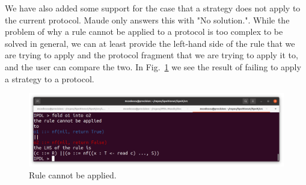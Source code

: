 \documentclass{article}
\begin{document}
We have also added some support for the case that a strategy does not
apply to the current protocol. Maude only answers this with "No solution.".
While the problem of why a rule cannot be applied to a protocol is too
complex to be solved in general, we can at least provide the left-hand side of the rule that we are trying to apply and the protocol fragment that we
are trying to apply it to, and the user can compare the two. In Fig.~\ref{fig:rule} we see the result of failing to apply a strategy to
a protocol. 

\begin{figure}[htp]
\caption{Rule cannot be applied.}\label{fig:rule}
\centering
\includegraphics[width=\textwidth]{proof}
\end{figure}
\end{document}
